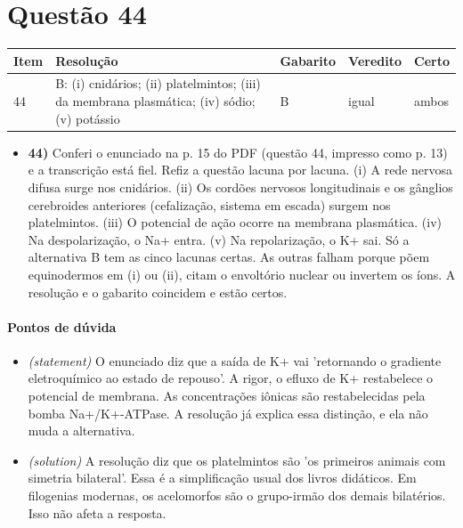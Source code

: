 \documentclass{article}%
\begin{document}
\section*{Questão 44}%
\begin{longtable}{@{}p{} p{} p{} p{} p{}@{}}\toprule Item & Resolução & Gabarito & Veredito & Certo \\ \midrule
44 & B: (i) cnidários; (ii) platelmintos; (iii) da membrana plasmática; (iv) sódio; (v) potássio & B & igual & ambos \\
\bottomrule\end{longtable}%
\begin{itemize}%
\item%
\textbf{44)} Conferi o enunciado na p. 15 do PDF (questão 44, impresso como p. 13) e a transcrição está fiel. Refiz a questão lacuna por lacuna. (i) A rede nervosa difusa surge nos cnidários. (ii) Os cordões nervosos longitudinais e os gânglios cerebroides anteriores (cefalização, sistema em escada) surgem nos platelmintos. (iii) O potencial de ação ocorre na membrana plasmática. (iv) Na despolarização, o Na+ entra. (v) Na repolarização, o K+ sai. Só a alternativa B tem as cinco lacunas certas. As outras falham porque põem equinodermos em (i) ou (ii), citam o envoltório nuclear ou invertem os íons. A resolução e o gabarito coincidem e estão certos.%
\end{itemize}%
\paragraph{Pontos de dúvida}%
\begin{itemize}%
\item%
\textit{(statement)} O enunciado diz que a saída de K+ vai 'retornando o gradiente eletroquímico ao estado de repouso'. A rigor, o efluxo de K+ restabelece o potencial de membrana. As concentrações iônicas são restabelecidas pela bomba Na+/K+{-}ATPase. A resolução já explica essa distinção, e ela não muda a alternativa.%
\item%
\textit{(solution)} A resolução diz que os platelmintos são 'os primeiros animais com simetria bilateral'. Essa é a simplificação usual dos livros didáticos. Em filogenias modernas, os acelomorfos são o grupo{-}irmão dos demais bilatérios. Isso não afeta a resposta.%
\end{itemize}%
\end{document}
